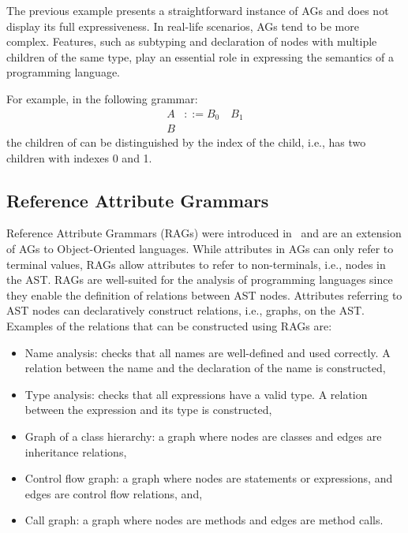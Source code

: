 The previous example presents a straightforward instance of AGs 
and does not display its full expressiveness. In real-life scenarios, AGs 
tend to be more complex. Features, such as subtyping and declaration of nodes with multiple 
children of the same type, play an essential role in expressing the semantics of 
a programming language.

For example, in the following grammar:
    \begin{align*}
        A& ::= B_0 \quad B_1 \\
        B&
    \end{align*}
the children of  can be distinguished by the index of the child, i.e.,  has two children
 with indexes 0 and 1.


\subsection{Reference Attribute Grammars}%
\label{sec:rag}
Reference Attribute Grammars (RAGs) were introduced in~\cite{DBLP:journals/informaticaSI/Hedin00}
and are an extension of AGs to Object-Oriented languages. While attributes in AGs
can only refer to terminal values, RAGs allow attributes to refer to non-terminals, i.e., nodes in the AST.
RAGs are well-suited for the analysis of programming languages since they enable
the definition of relations between AST nodes. Attributes referring
to AST nodes can declaratively construct relations, i.e., graphs, on the AST.
Examples of the relations that can be constructed using RAGs are:
\begin{itemize}
    \item Name analysis: checks that all names are well-defined and used correctly. A relation between
    the name and the declaration of the name is constructed,
    \item Type analysis: checks that all expressions have a valid type. A relation between the expression
    and its type is constructed,
    \item Graph of a class hierarchy: a graph where nodes are classes and edges are inheritance relations,
    \item Control flow graph: a graph where nodes are statements or expressions, and edges are control flow relations, and,
    \item Call graph: a graph where nodes are methods and edges are method calls.
\end{itemize}



